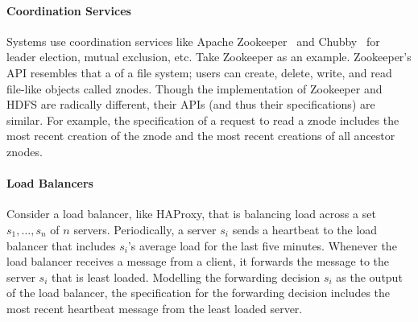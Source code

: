 \paragraph{Coordination Services}
Systems use coordination services like Apache
Zookeeper~\cite{hunt2010zookeeper} and Chubby~\cite{burrows2006chubby} for
leader election, mutual exclusion, etc. Take Zookeeper as an example.
Zookeeper's API resembles that a of a file system; users can create, delete,
write, and read file-like objects called znodes. Though the implementation of
Zookeeper and HDFS are radically different, their APIs (and thus their
\watprovenance{} specifications) are similar. For example, the \watprovenance{}
specification of a request to read a znode includes the most recent creation of
the znode and the most recent creations of all ancestor znodes. 

\paragraph{Load Balancers}
Consider a load balancer, like HAProxy, that is balancing load across a set
$s_1, \ldots, s_n$ of $n$ servers. Periodically, a server $s_i$ sends a
heartbeat to the load balancer that includes $s_i$'s average load for the last
five minutes. Whenever the load balancer receives a message from a client, it
forwards the message to the server $s_i$ that is least loaded. Modelling the
forwarding decision $s_i$ as the output of the load balancer, the
\watprovenance{} specification for the forwarding decision includes the most
recent heartbeat message from the least loaded server.


